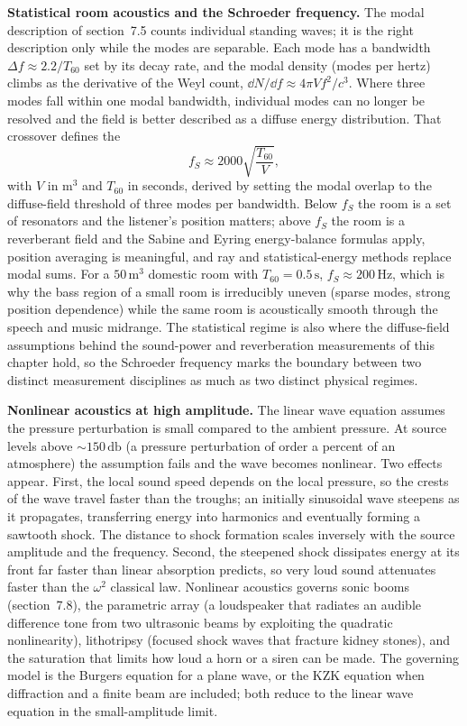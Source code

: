 \begin{mastery}
\textbf{Statistical room acoustics and the Schroeder frequency.} The
modal description of section~7.5 counts individual standing waves; it is
the right description only while the modes are separable. Each mode has
a bandwidth $\Delta f \approx 2.2/T_{60}$ set by its decay rate, and the
modal density (modes per hertz) climbs as the derivative of the Weyl
count, $\dd N/\dd f \approx 4\pi V f^2/c^3$. Where three modes fall
within one modal bandwidth, individual modes can no longer be resolved
and the field is better described as a diffuse energy distribution. That
crossover defines the 
\[
f_S \approx 2000\sqrt{\frac{T_{60}}{V}},
\]
with $V$ in $\si{\meter\cubed}$ and $T_{60}$ in seconds, derived by
setting the modal overlap to the diffuse-field threshold of three modes
per bandwidth. Below $f_S$ the room is a set of resonators and the
listener's position matters; above $f_S$ the room is a reverberant field
and the Sabine and Eyring energy-balance formulas apply, position
averaging is meaningful, and ray and statistical-energy methods replace
modal sums. For a $50\,\si{\meter\cubed}$ domestic room with
$T_{60}=0.5\,\si{\second}$, $f_S\approx 200\,\si{\hertz}$, which is why
the bass region of a small room is irreducibly uneven (sparse modes,
strong position dependence) while the same room is acoustically smooth
through the speech and music midrange. The statistical regime is also
where the diffuse-field assumptions behind the sound-power and
reverberation measurements of this chapter hold, so the Schroeder
frequency marks the boundary between two distinct measurement
disciplines as much as two distinct physical regimes.
\end{mastery}

\begin{mastery}
\textbf{Nonlinear acoustics at high amplitude.} The linear wave
equation assumes the pressure perturbation is small compared to the
ambient pressure. At source levels above $\sim 150\,\si{\decibel}$ (a
pressure perturbation of order a percent of an atmosphere) the
assumption fails and the wave becomes nonlinear. Two effects appear.
First, the local sound speed depends on the local pressure, so the
crests of the wave travel faster than the troughs; an initially
sinusoidal wave steepens as it propagates, transferring energy into
harmonics and eventually forming a sawtooth shock. The distance to
shock formation scales inversely with the source amplitude and the
frequency. Second, the steepened shock dissipates energy at its front
far faster than linear absorption predicts, so very loud sound
attenuates faster than the $\omega^2$ classical law. Nonlinear
acoustics governs sonic booms (section~7.8), the parametric array (a
loudspeaker that radiates an audible difference tone from two
ultrasonic beams by exploiting the quadratic nonlinearity), lithotripsy
(focused shock waves that fracture kidney stones), and the saturation
that limits how loud a horn or a siren can be made. The governing
model is the Burgers equation for a plane wave, or the KZK equation
when diffraction and a finite beam are included; both reduce to the
linear wave equation in the small-amplitude limit.
\end{mastery}

